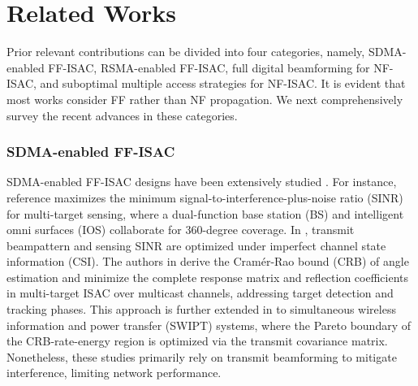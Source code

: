 \section{Related Works}
Prior relevant contributions can be divided into four categories, namely, SDMA-enabled FF-ISAC\cite{10464353,10679658,10251151,10382465}, RSMA-enabled FF-ISAC\cite{gong2024hybrid,10486996,10032141,10522473,10287099}, full digital beamforming for NF-ISAC\cite{10520715,10694020,hua2024near,10681603}, and suboptimal multiple access strategies for NF-ISAC\cite{10135096,meng2024hybrid,10700785,10579914}. It is evident that most works consider FF rather than NF propagation.  We next comprehensively survey the recent advances in these categories.



\subsubsection{SDMA-enabled FF-ISAC} SDMA-enabled FF-ISAC designs have been extensively studied \cite{10464353,10679658,10251151,10382465}. For instance, reference \cite{10464353} maximizes the minimum signal-to-interference-plus-noise ratio (SINR) for multi-target sensing, where a dual-function base station (BS) and intelligent omni surfaces (IOS) collaborate for 360-degree coverage. In \cite{10679658}, transmit beampattern and sensing SINR are optimized under imperfect channel state information (CSI). The authors in \cite{10251151} derive the Cram\'{e}r-Rao bound (CRB) of angle estimation and minimize the complete response matrix and reflection coefficients in multi-target ISAC over multicast channels, addressing target detection and tracking phases. This approach is further extended in \cite{10382465} to simultaneous wireless information and power transfer (SWIPT) systems, where the Pareto boundary of the CRB-rate-energy region is optimized via the transmit covariance matrix. Nonetheless, these studies primarily rely on transmit beamforming to mitigate interference, limiting network performance.

